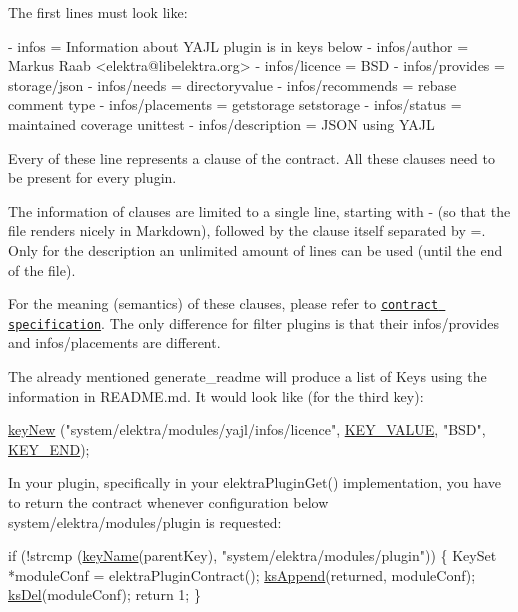 The first lines must look like\+:


\begin{DoxyCode}
- infos = Information about YAJL plugin is in keys below
- infos/author = Markus Raab <elektra@libelektra.org>
- infos/licence = BSD
- infos/provides = storage/json
- infos/needs = directoryvalue
- infos/recommends = rebase comment type
- infos/placements = getstorage setstorage
- infos/status = maintained coverage unittest
- infos/description = JSON using YAJL
\end{DoxyCode}


Every of these line represents a clause of the contract. All these clauses need to be present for every plugin.

The information of clauses are limited to a single line, starting with {\ttfamily -\/} (so that the file renders nicely in Markdown), followed by the clause itself separated by {\ttfamily =}. Only for the description an unlimited amount of lines can be used (until the end of the file).

For the meaning (semantics) of these clauses, please refer to \href{/home/jenkins/workspace/libelektra-release/doc/CONTRACT.ini}{\tt contract specification}. The only difference for filter plugins is that their {\ttfamily infos/provides} and {\ttfamily infos/placements} are different.

The already mentioned {\ttfamily generate\+\_\+readme} will produce a list of Keys using the information in {\ttfamily R\+E\+A\+D\+M\+E.\+md}. It would look like (for the third key)\+:


\begin{DoxyCode}
\hyperlink{group__key_gad23c65b44bf48d773759e1f9a4d43b89}{keyNew} (\textcolor{stringliteral}{"system/elektra/modules/yajl/infos/licence"},
        \hyperlink{group__key_gga9b703ca49f48b482def322b77d3e6bc8ac66e4a49d09212b79f5754ca6db5bd2e}{KEY\_VALUE}, \textcolor{stringliteral}{"BSD"}, \hyperlink{group__key_gga9b703ca49f48b482def322b77d3e6bc8aa8adb6fcb92dec58fb19410eacfdd403}{KEY\_END});
\end{DoxyCode}


In your plugin, specifically in your {\ttfamily elektra\+Plugin\+Get()} implementation, you have to return the contract whenever configuration below {\ttfamily system/elektra/modules/plugin} is requested\+:


\begin{DoxyCode}
\textcolor{keywordflow}{if} (!strcmp (\hyperlink{group__keyname_ga8e805c726a60da921d3736cda7813513}{keyName}(parentKey), \textcolor{stringliteral}{"system/elektra/modules/plugin"}))
\{
        KeySet *moduleConf = elektraPluginContract();
        \hyperlink{group__keyset_ga21eb9c3a14a604ee3a8bdc779232e7b7}{ksAppend}(returned, moduleConf);
        \hyperlink{group__keyset_ga27e5c16473b02a422238c8d970db7ac8}{ksDel}(moduleConf);
        \textcolor{keywordflow}{return} 1;
\}
\end{DoxyCode}


